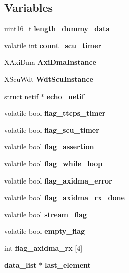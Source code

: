\subsection*{Variables}
\begin{DoxyCompactItemize}
\item 
\mbox{\label{interrupt_8c_a10d4b078b1c75c6de297b5a2b22cb8e3}} 
uint16\+\_\+t {\bfseries length\+\_\+dummy\+\_\+data}
\item 
\mbox{\label{interrupt_8c_a6f03c2bee8cf4ef8c4319f1f60561ad1}} 
volatile int {\bfseries count\+\_\+scu\+\_\+timer}
\item 
\mbox{\label{interrupt_8c_a3049748e366fb5472553cdbe9df0bc58}} 
X\+Axi\+Dma {\bfseries Axi\+Dma\+Instance}
\item 
\mbox{\label{interrupt_8c_afd1f6e74a3d4d317436684e7fa64a8fa}} 
X\+Scu\+Wdt {\bfseries Wdt\+Scu\+Instance}
\item 
\mbox{\label{interrupt_8c_acd12279932e5216593ee76d4eebdd996}} 
struct netif $\ast$ {\bfseries echo\+\_\+netif}
\item 
\mbox{\label{interrupt_8c_ae1142987fecfa0c02e7edfb9f539805b}} 
volatile bool {\bfseries flag\+\_\+ttcps\+\_\+timer}
\item 
\mbox{\label{interrupt_8c_a92815e63a8bb041c9594c7229d49cd89}} 
volatile bool {\bfseries flag\+\_\+scu\+\_\+timer}
\item 
\mbox{\label{interrupt_8c_af9ff4df27689ce692fdfe44a8efec098}} 
volatile bool {\bfseries flag\+\_\+assertion}
\item 
\mbox{\label{interrupt_8c_a68bc1b11e54681f4601358507aa9a3ad}} 
volatile bool {\bfseries flag\+\_\+while\+\_\+loop}
\item 
\mbox{\label{interrupt_8c_a226727c48b3bfd0888096614ee551f89}} 
volatile bool {\bfseries flag\+\_\+axidma\+\_\+error}
\item 
\mbox{\label{interrupt_8c_af3d0d90fb2e8215cab44c4a6c6c268fc}} 
volatile bool {\bfseries flag\+\_\+axidma\+\_\+rx\+\_\+done}
\item 
\mbox{\label{interrupt_8c_ac285664a88629c304befd42daafc3f90}} 
volatile bool {\bfseries stream\+\_\+flag}
\item 
\mbox{\label{interrupt_8c_ad53968991c134c5dbfc1d0d83e5decdb}} 
volatile bool {\bfseries empty\+\_\+flag}
\item 
\mbox{\label{interrupt_8c_a7ab3cdc6684119650796bf71c8c37b81}} 
int {\bfseries flag\+\_\+axidma\+\_\+rx} [4]
\item 
\mbox{\label{interrupt_8c_ac3c6e218717075ded198514020bb8013}} 
\textbf{ data\+\_\+list} $\ast$ {\bfseries last\+\_\+element}
\end{DoxyCompactItemize}


